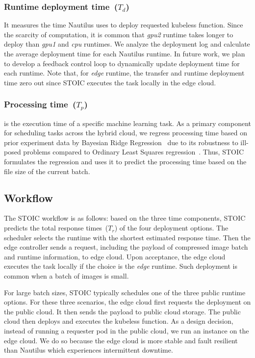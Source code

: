  \subsubsection{Runtime deployment time~($T_d$)} It measures the time Nautilus uses to deploy requested kubeless function. Since the scarcity of computation, it is common that \textit{gpu2} runtime takes longer to deploy than \textit{gpu1} and \textit{cpu} runtimes. We analyze the deployment log and calculate the average deployment time for each Nautilus runtime. In future work, we plan to develop a feedback control loop to dynamically update deployment time for each runtime. Note that, for \textit{edge} runtime, the transfer and runtime deployment time zero out since STOIC executes the task locally in the edge cloud.
 
 \subsubsection{Processing time~($T_p$)} is the execution time of a specific machine learning task. As a primary component for scheduling tasks across the hybrid cloud, we regress processing time based on prior experiment data by Bayesian Ridge Regression~\cite{ref:brr} due to its robustness to ill-posed problems compared to Ordinary Least Squares regression~\cite{ref:ols}. Thus, STOIC formulates the regression and uses it to predict the processing time based on the file size of the current batch. %
 
 \subsection{Workflow}
 The STOIC workflow is as follows: based on the three time components, STOIC predicts the total response times~($T_r$) of the four deployment options. The scheduler selects the runtime with the shortest estimated response time. Then the edge controller sends a request, including the payload of compressed image batch and runtime information, to edge cloud. Upon acceptance, the edge cloud executes the task locally if the choice is the \textit{edge} runtime. Such deployment is common when a batch of images is small. 

For large batch sizes, STOIC typically schedules one of the three public runtime options. For these three scenarios, the edge cloud first requests the deployment on the public cloud. It then sends the payload to public cloud storage. The public cloud then deploys and executes the kubeless function. As a design decision, instead of running a requester pod in the public cloud, we run an instance on the edge cloud. We do so because the edge cloud is more stable and fault resilient than Nautilus which experiences intermittent downtime.  
 
